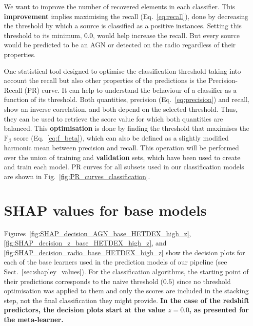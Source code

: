 \documentclass{aa}
\begin{document}
\begin{appendix}
We want to improve the number of recovered elements in each classifier. This \textbf{improvement} implies maximising the recall (Eq.~\ref{eq:recall}), done by decreasing the threshold by which a source is classified as a positive instances. Setting this threshold to its minimum, $0.0$, would help increase the recall. But every source would be predicted to be an AGN or detected on the radio regardless of their properties.%

One statistical tool designed to optimise the classification threshold taking into account the recall but also other properties of the predictions is the Precision-Recall (PR) curve. It can help to understand the behaviour of a classifier as a function of its threshold. Both quantities, precision (Eq.~\ref{eq:precision}) and recall, show an inverse correlation, and both depend on the selected threshold. Thus, they can be used to retrieve the score value for which both quantities are balanced. This \textbf{optimisation} is done by finding the threshold that maximises the $\mathrm{F}_{\beta}$ score (Eq.~\ref{eq:f_beta}), which can also be defined as a slightly modified harmonic mean between precision and recall. This operation will be performed over the union of training and \textbf{validation} sets, which have been used to create and train each model. PR curves for all subsets used in our classification models are shown in Fig.~\ref{fig:PR_curves_classification}.

\section{SHAP values for base models}\label{sec:app_shap_base}

Figures~\ref{fig:SHAP_decision_AGN_base_HETDEX_high_z}, \ref{fig:SHAP_decision_z_base_HETDEX_high_z}, and \ref{fig:SHAP_decision_radio_base_HETDEX_high_z} show the decision plots for each of the base learners used in the prediction models of our pipeline (see Sect.~\ref{sec:shapley_values}). For the classification algorithms, the starting point of their predictions corresponds to the naive threshold ($0.5$) since no threshold optimisation was applied to them and only the scores are included in the stacking step, not the final classification they might provide. \textbf{In the case of the redshift predictors, the decision plots start at the value $z = 0.0$, as presented for the meta-learner.}


\end{appendix}
\end{document}

